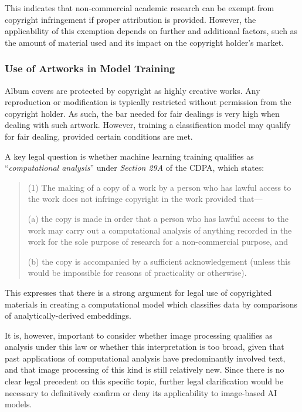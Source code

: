                   This indicates that non-commercial academic research can be exempt from copyright infringement if proper attribution is provided. However, the applicability of this exemption depends on further and additional factors, such as the amount of material used and its impact on the copyright holder’s market.
  
              \subsubsection{Use of Artworks in Model Training}
              
                  Album covers are protected by copyright as highly creative works. Any reproduction or modification is typically restricted without permission from the copyright holder. As such, the bar needed for fair dealings is very high when dealing with such artwork. However, training a classification model may qualify for fair dealing, provided certain conditions are met.
  
                  A key legal question is whether machine learning training qualifies as ``\textit{computational analysis}'' under \textit{Section 29A} of the CDPA, which states:
                  \begin{quote}
                      (1) The making of a copy of a work by a person who has lawful access to the work does not infringe copyright in the work provided that—
                  
                          (a) the copy is made in order that a person who has lawful access to the work may carry out a computational analysis of anything recorded in the work for the sole purpose of research for a non-commercial purpose, and
                          
                          (b) the copy is accompanied by a sufficient acknowledgement (unless this would be impossible for reasons of practicality or otherwise). \cite{cdpa1988}
                  \end{quote}
  
                  This expresses that there is a strong argument for legal use of copyrighted materials in creating a computational model which classifies data by comparisons of analytically-derived embeddings.
  
                  It is, however, important to consider whether image processing qualifies as analysis under this law or whether this interpretation is too broad, given that past applications of computational analysis have predominantly involved text, and that image processing of this kind is still relatively new. Since there is no clear legal precedent on this specific topic, further legal clarification would be necessary to definitively confirm or deny its applicability to image-based AI models.
  
